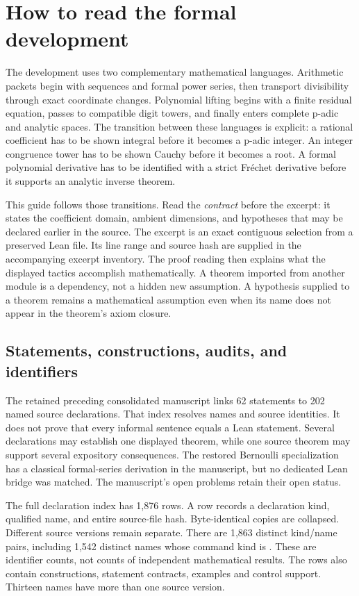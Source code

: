 \section{How to read the formal development}\label{sec:reading}
The development uses two complementary mathematical languages. Arithmetic packets begin with sequences and formal power series, then transport divisibility through exact coordinate changes. Polynomial lifting begins with a finite residual equation, passes to compatible digit towers, and finally enters complete p-adic and analytic spaces. The transition between these languages is explicit: a rational coefficient has to be shown integral before it becomes a p-adic integer. An integer congruence tower has to be shown Cauchy before it becomes a root. A formal polynomial derivative has to be identified with a strict Fr\'echet derivative before it supports an analytic inverse theorem.

This guide follows those transitions. Read the \emph{contract} before the excerpt: it states the coefficient domain, ambient dimensions, and hypotheses that may be declared earlier in the source. The excerpt is an exact contiguous selection from a preserved Lean file. Its line range and source hash are supplied in the accompanying excerpt inventory. The proof reading then explains what the displayed tactics accomplish mathematically. A theorem imported from another module is a dependency, not a hidden new assumption. A hypothesis supplied to a theorem remains a mathematical assumption even when its name does not appear in the theorem's axiom closure.

\subsection{Statements, constructions, audits, and identifiers}
The retained preceding consolidated manuscript links 62 statements to 202 named source declarations. That index resolves names and source identities. It does not prove that every informal sentence equals a Lean statement. Several declarations may establish one displayed theorem, while one source theorem may support several expository consequences. The restored Bernoulli specialization has a classical formal-series derivation in the manuscript, but no dedicated Lean bridge was matched. The manuscript's open problems retain their open status.

The full declaration index has 1,876 rows. A row records a declaration kind, qualified name, and entire source-file hash. Byte-identical copies are collapsed. Different source versions remain separate. There are 1,863 distinct kind/name pairs, including 1,542 distinct names whose command kind is . These are identifier counts, not counts of independent mathematical results. The rows also contain constructions, statement contracts, examples and control support. Thirteen names have more than one source version.


